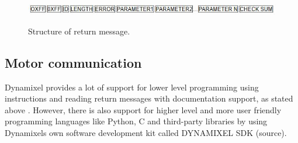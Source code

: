 \begin{figure}[H]
    \graphicspath{ {img/} }
    \centering
    
    \includegraphics[width = 9 cm]{img/return_packadge.JPG}
    \label{return}
    \caption{Structure of return message.}
\end{figure}

\subsection{Motor communication}
Dynamixel provides a lot of support for lower level programming using instructions and reading return messages with documentation support, as stated above
. However, there is also support for higher level and more user friendly programming languages like Python,
C and third-party libraries by using Dynamixels own software development kit called DYNAMIXEL SDK (source).


